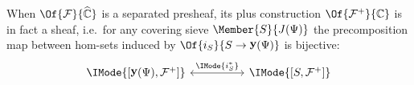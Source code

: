 \documentclass{article}
\DeclareMathOperator\OpYoneda{\mathbf{y}}
\newcommand\Yoneda[1]{\OpYoneda({#1})}
\newcommand\Psh[1]{\widehat{#1}}
\newcommand\Plus[1]{{#1}^+}
\begin{document}

\begin{thm}\label{thm:plus-sheaf}
  When $\Of{\mathcal{F}}{\Psh{\mathbb{C}}}$ is a separated presheaf, its plus
  construction $\Of{\Plus{\mathcal{F}}}{\mathbb{C}}$ is in fact a sheaf, i.e.\
  for any covering sieve $\Member{S}{J(\Psi)}$ the precomposition map
  between hom-sets induced by $\Of{i_S}{S\to\Yoneda{\Psi}}$ is
  bijective:
  \[
    \begin{tikzcd}[sep=huge]
      \IMode{[\Yoneda{\Psi},\Plus{\mathcal{F}}]}
      \arrow[r,leftrightarrow,"\IMode{i_S^*}"]
      &
      \IMode{[S,\Plus{\mathcal{F}}]}
    \end{tikzcd}
  \]
\end{thm}
\end{document}
